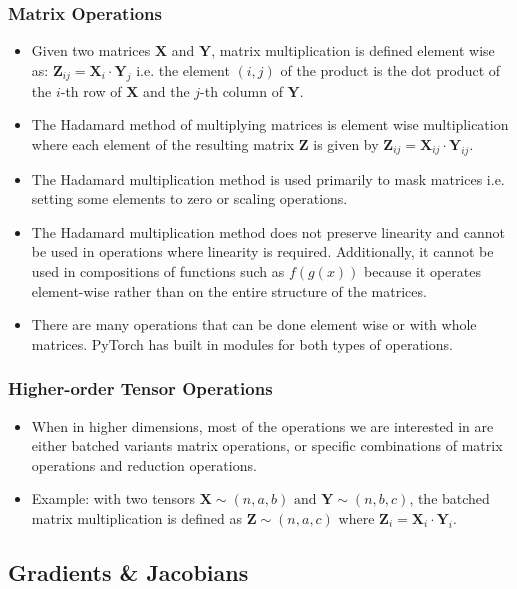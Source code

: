 \documentclass{article}
\newcommand{\mbf}[1]{\mathbf{#1}}
\begin{document}
\subsubsection{Matrix Operations}

\begin{itemize}
     \item Given two matrices $\mbf{X}$ and $\mbf{Y}$, matrix multiplication is defined element wise as: $\mbf{Z}_{ij} = \mbf{X}_i \cdot \mbf{Y}_j$ 
        i.e. the element $(i,j)$ of the product is the dot product of the $i$-th row of $\mbf{X}$ and the $j$-th column of $\mbf{Y}$.
        \item The Hadamard method of multiplying matrices is element wise multiplication where each element of the resulting matrix $\mbf{Z}$ is given by $\mbf{Z}_{ij} = \mbf{X}_{ij} \cdot \mbf{Y}_{ij}$.
        \item The Hadamard multiplication method is used primarily to mask matrices i.e. setting some elements to zero or scaling operations. 
        \item The Hadamard multiplication method does not preserve linearity and cannot be used in operations where linearity is required. Additionally, it cannot be used in compositions of functions such as $f(g(x))$ because it operates element-wise rather than on the entire structure of the matrices.
        \item There are many operations that can be done element wise or with whole matrices. PyTorch has built in modules for both types of operations. 
\end{itemize}

\subsubsection{Higher-order Tensor Operations}

\begin{itemize}
    \item When in higher dimensions, most of the operations we are interested in are either batched variants matrix operations, or specific combinations of matrix operations and reduction operations. 
    \item Example: with two tensors $\mbf{X} \sim (n,a,b) \text{ and } \mbf{Y} \sim (n,b,c)$, the batched matrix multiplication is defined as $\mbf{Z} \sim (n,a,c)$ where $\mbf{Z}_{i} = \mbf{X}_i \cdot \mbf{Y}_i$.
\end{itemize}

\subsection{Gradients \& Jacobians}
\end{document}
